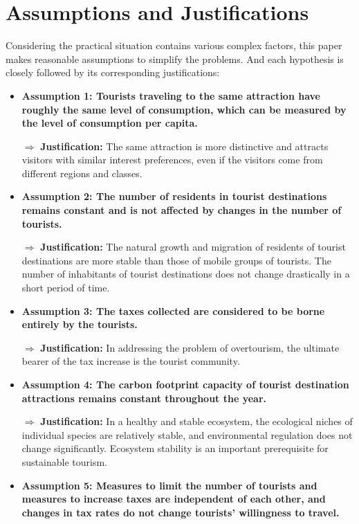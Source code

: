 \documentclass{mcmthesis}
\begin{document}
\section{Assumptions and Justifications}
{Considering the practical situation contains various complex factors, this paper makes reasonable assumptions to simplify the problems. And each hypothesis is closely followed by its corresponding justifications:}
\begin{itemize}
  \item \textbf{Assumption 1: Tourists traveling to the same attraction have roughly the same level of consumption, which can be measured by the level of consumption per capita.}
  
  $\Rightarrow$ \textbf{Justification:} The same attraction is more distinctive and attracts visitors with similar interest preferences, even if the visitors come from different regions and classes.
  \item \textbf{Assumption 2: The number of residents in tourist destinations remains constant and is not affected by changes in the number of tourists.}
  
  $\Rightarrow$ \textbf{Justification:} The natural growth and migration of residents of tourist destinations are more stable than those of mobile groups of tourists. The number of inhabitants of tourist destinations does not change drastically in a short period of time.
  \item \textbf{Assumption 3: The taxes collected are considered to be borne entirely by the tourists.}
  
  $\Rightarrow$ \textbf{Justification:} In addressing the problem of overtourism, the ultimate bearer of the tax increase is the tourist community.
  \item \textbf{Assumption 4: The carbon footprint capacity of tourist destination attractions remains constant throughout the year.}
  
  $\Rightarrow$ \textbf{Justification:} In a healthy and stable ecosystem, the ecological niches of individual species are relatively stable, and environmental regulation does not change significantly. Ecosystem stability is an important prerequisite for sustainable tourism.
  \item \textbf{Assumption 5: Measures to limit the number of tourists and measures to increase taxes are independent of each other, and changes in tax rates do not change tourists' willingness to travel.}
  

\end{itemize}
\end{document}
